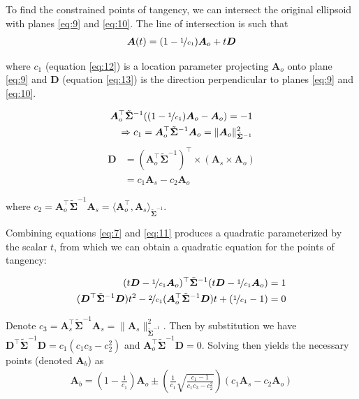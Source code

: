 \documentclass[preprint]{seismica}
\begin{document}
    To find the constrained points of tangency, we can intersect the original ellipsoid with planes
    \ref{eq:9} and \ref{eq:10}. The line of intersection is such that
    \begin{align} \label{eq:11}
      \bm{A}(t) = (1 - \nicefrac{1}{c_1}) \bm{A}_o + t\bm{D}
    \end{align}

    \noindent where $c_1$ (equation \ref{eq:12}) is a location parameter projecting $\bm{A}_o$ onto plane \ref{eq:9}
    and $\bm{D}$ (equation \ref{eq:13}) is the direction perpendicular to planes \ref{eq:9} and \ref{eq:10}. 

    \begin{align} \label{eq:12}
      \nonumber \bm{A}_o^\top \tilde{\bm{\Sigma}}^{-1} ((1 - \nicefrac{1}{c_1})\bm{A}_o - \bm{A}_o)  = -1\\
      \Rightarrow c_1 = \bm{A}_o^\top \tilde{\bm{\Sigma}}^{-1} \bm{A}_o = \|\bm{A}_o\|_{\tilde{\bm{\Sigma}}^{-1}}^2
    \end{align}
    \begin{align} \label{eq:13}
      \nonumber\bm{D} &= (\bm{A}_o^\top \tilde{\bm{\Sigma}}^{-1})^\top \times (\bm{A}_s \times \bm{A}_o)\\
        &= c_1\bm{A}_s - c_2\bm{A}_o
    \end{align}

    \noindent where $c_2 = \bm{A}_o^\top \tilde{\bm{\Sigma}}^{-1} \bm{A}_s = \langle\bm{A}_o^\top, \bm{A}_s\rangle_{\tilde{\bm{\Sigma}}^{-1}}$.

    Combining equations \ref{eq:7} and \ref{eq:11} produces a quadratic parameterized by the scalar $t$,
    from which we can obtain a quadratic equation for the points of tangency:

    \begin{align} \label{eq:14}
      \nonumber (t\bm{D} - \nicefrac{1}{c_1}\bm{A}_o)^\top \tilde{\bm{\Sigma}}^{-1} (t\bm{D} - \nicefrac{1}{c_1}\bm{A}_o)  = 1\\
      ({\bm{D}^\top \tilde{\bm{\Sigma}}^{-1} \bm{D}})t^2 - 
          \nicefrac{2}{c_1}(\bm{A}_o^\top \tilde{\bm{\Sigma}}^{-1} \bm{D})t + (\nicefrac{1}{c_1} - 1) = 0
    \end{align}

    Denote $c_3 = \bm{A}_s^\top \tilde{\bm{\Sigma}}^{-1} \bm{A}_s = \|\bm{A}_s\|_{\tilde{\bm{\Sigma}}^{-1}}^2$. Then by
    substitution we have
    ${\bm{D}^\top \tilde{\bm{\Sigma}}^{-1} \bm{D}} = c_1(c_1c_3 - c_2^2)$ and ${\bm{A}_o^\top \tilde{\bm{\Sigma}}^{-1} \bm{D}} = 0$.
    Solving then yields the necessary points (denoted $\bm{A}_b$) as
    \begin{align} \label{eq:15}
      \bm{A}_b = \left(1 - \frac{1}{c_1}\right)\bm{A}_o \pm
        \left(\frac{1}{c_1} \sqrt{\frac{c_1 - 1}{c_1c_3 - c_2^2}}\right)(c_1\bm{A}_s - c_2\bm{A}_o)
    \end{align}
\end{document}
